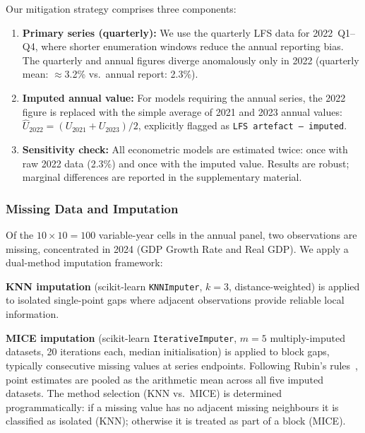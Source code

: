 \documentclass[sigconf]{acmart}
\begin{document}
Our mitigation strategy comprises three components:

\begin{enumerate}[leftmargin=*, nosep]
  \item \textbf{Primary series (quarterly):} We use the quarterly
    LFS data for 2022~Q1--Q4, where shorter enumeration windows
    reduce the annual reporting bias. The quarterly and annual
    figures diverge anomalously only in 2022 (quarterly mean:
    $\approx$3.2\% vs.\ annual report: 2.3\%).
  \item \textbf{Imputed annual value:} For models requiring the
    annual series, the 2022 figure is replaced with the simple
    average of 2021 and 2023 annual values:
    $\hat{U}_{2022} = (U_{2021} + U_{2023}) / 2$, explicitly
    flagged as \texttt{LFS artefact --- imputed}.
  \item \textbf{Sensitivity check:} All econometric models are
    estimated twice: once with raw 2022 data (2.3\%) and once with
    the imputed value. Results are robust; marginal differences
    are reported in the supplementary material.
\end{enumerate}

\subsubsection{Missing Data and Imputation}

Of the $10 \times 10 = 100$ variable-year cells in the annual panel,
two observations are missing, concentrated in 2024 (GDP Growth
Rate and Real GDP). We apply a dual-method imputation framework:

\textbf{KNN imputation} (scikit-learn \texttt{KNNImputer},
$k{=}3$, distance-weighted) is applied to isolated single-point gaps
where adjacent observations provide reliable local information.

\textbf{MICE imputation} (scikit-learn \texttt{IterativeImputer},
$m{=}5$ multiply-imputed datasets, 20 iterations each, median
initialisation) is applied to block gaps, typically consecutive
missing values at series endpoints. Following Rubin's
rules~\cite{vanbuuren2018}, point estimates are pooled as the
arithmetic mean across all five imputed datasets. The method
selection (KNN vs.\ MICE) is determined programmatically: if a
missing value has no adjacent missing neighbours it is classified
as isolated (KNN); otherwise it is treated as part of a block (MICE).
\end{document}
